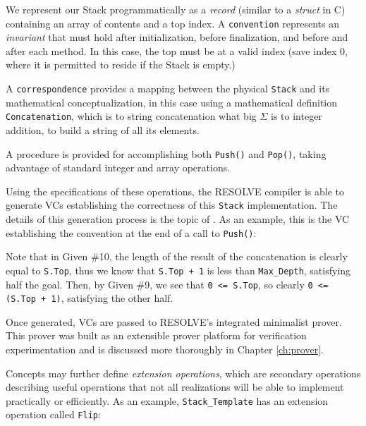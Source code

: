 

We represent our Stack programmatically as a \emph{record} (similar to a \emph{struct} in C) containing an array of contents and a top index.  A \texttt{convention} represents an \emph{invariant} that must hold after initialization, before finalization, and before and after each method.  In this case, the top must be at a valid index (save index 0, where it is permitted to reside if the Stack is empty.)

A \texttt{correspondence} provides a mapping between the physical \texttt{Stack} and its mathematical conceptualization, in this case using a mathematical definition \texttt{Concatenation}, which is to string concatenation what big $\Sigma$ is to integer addition, to build a string of all its elements.

A procedure is provided for accomplishing both \texttt{Push()} and \texttt{Pop()}, taking advantage of standard integer and array operations.

Using the specifications of these operations, the RESOLVE compiler is able to generate VCs establishing the correctness of this \texttt{Stack} implementation.  The details of this generation process is the topic of \cite{hartonDissertation}.  As an example, this is the VC establishing the convention at the end of a call to \texttt{Push()}:



Note that in Given \#10, the length of the result of the concatenation is clearly equal to \texttt{S.Top}, thus we know that \texttt{S.Top + 1} is less than \texttt{Max\_Depth}, satisfying half the goal.  Then, by Given \#9, we see that \texttt{0 <= S.Top}, so clearly \texttt{0 <= (S.Top + 1)}, satisfying the other half.

Once generated, VCs are passed to RESOLVE's integrated minimalist prover.  This prover was built as an extensible prover platform for verification experimentation\cite{smith10} and is discussed more thoroughly in Chapter \ref{ch:prover}.

Concepts may further define \emph{extension operations}, which are secondary operations describing useful operations that not all realizations will be able to implement practically or efficiently.  As an example, \texttt{Stack\_Template} has an extension operation called \texttt{Flip}:

\mbox{}

